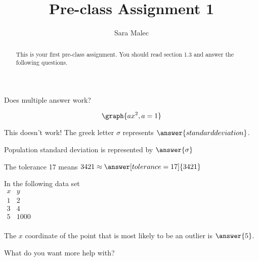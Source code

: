 \documentclass[handout]{ximera}
\title{Pre-class Assignment 1}
\author{Sara Malec}
\begin{document}
\begin{abstract}
  This is your first pre-class assignment. You should read section 1.3 and answer the following questions.
\end{abstract}
\maketitle


\begin{problem} Does multiple answer work?
\begin{multipleChoice}
\end{multipleChoice}
\end{problem}

\begin{problem}
   \[ 
   \graph{ax^2, a=1}
   \]
\end{problem}

\begin{problem}
    This doesn't work! The greek letter $\sigma$ represents $\answer{standard deviation}$.
\end{problem}

\begin{problem}
    Population standard deviation is represented by $\answer{\sigma}$
\end{problem}

\begin{problem}
   The tolerance 17 means $3421 \approx \answer[tolerance=17]{3421}$
\end{problem}

\begin{problem}

    In the following data set\\
    
$\begin{array}{c|c}
    x&y\\
    \hline
    1&2\\
    3&4\\
    5&1000\\
\end{array}$
    
\begin{prompt}
    The $x$ coordinate of the point that is most likely to be an outlier is $\answer{5}$.
\end{prompt}
\end{problem}

\begin{problem}
\begin{freeResponse}
What do you want more help with?
\end{freeResponse}
\end{problem}
\end{document}
